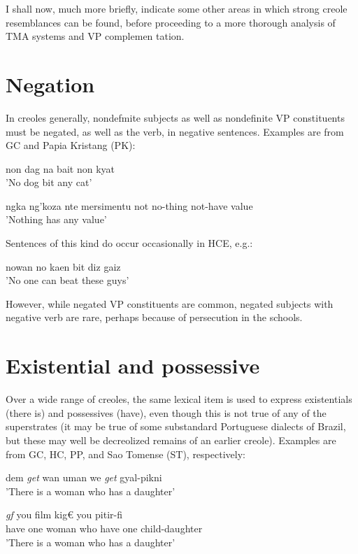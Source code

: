 I shall now, much more briefly, indicate some other areas in which strong creole resemblances can be found, before proceeding to a more thorough analysis of TMA systems and VP complemen tation.

\section{Negation}

In creoles generally, nondefmite subjects as well as nondefinite VP constituents must be negated, as well as the verb, in negative sentences. Examples are from GC and Papia Kristang (PK):


\ea\label{ex:52}
 non dag na bait non kyat\\
\glt 'No dog bit any cat'
\z

\ea\label{ex:53}
 ngka ng'koza nte mersimentu not no-thing not-have value \\
\glt'Nothing has any value'
\z

Sentences of this kind do occur occasionally in HCE, e.g.:

\ea\label{ex:54}
 nowan no kaen bit diz gaiz \\
\glt 'No one can beat these guys'
\z

However, while negated VP constituents are common, negated subjects with negative verb are rare, perhaps because of persecution in the schools.

\section{Existential and possessive}

Over a wide range of creoles, the same lexical item is used to express existentials ({\textquotedbl}there is{\textquotedbl}) and possessives ({\textquotedbl}have{\textquotedbl}), even though this is not true of any of the superstrates (it may be true of some substandard Portuguese dialects of Brazil, but these may well be de\-creolized remains of an earlier creole). Examples are from GC, HC, PP, and Sao Tomense (ST), respectively:

\ea\label{ex:55}
 dem \textit{get} wan uman we \textit{get }gyal-pikni \\
\glt'There is a woman who has a daughter'
\z

\ea\label{ex:56}
\gll \textit{gf} you film kig€ you pitir-fi\\
have one woman who have one child-daughter\\
\glt 'There is a woman who has a daughter'
\z

